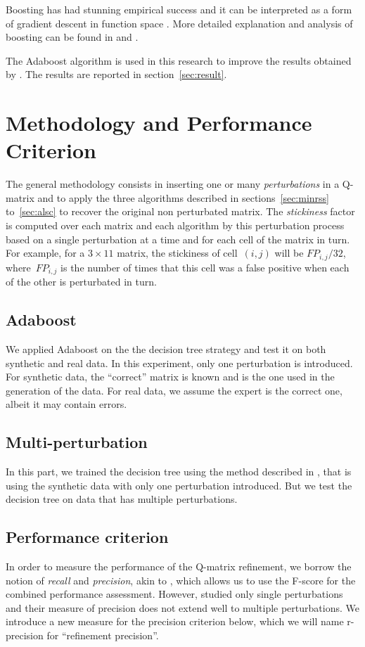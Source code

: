 \documentclass{edm_template}
\begin{document}
Boosting has had stunning empirical success \cite{caruana2006empirical} and it can be interpreted as a form of gradient descent in function space \cite{breiman1998arcing}. More detailed explanation and analysis of boosting can be found in and . 

The Adaboost algorithm is used in this research to improve the results obtained by . The results are reported in section~\ref{sec:result}.

\section{Methodology and Performance Criterion}

The general methodology consists in inserting one or many \textit{perturbations} in a Q-matrix and to apply the three algorithms described in sections~\ref{sec:minrss} to~\ref{sec:alsc} to recover the original non perturbated matrix.  The \textit{stickiness} factor is computed over each matrix and each algorithm by this perturbation process based on a single perturbation at a time and for each cell of the matrix in turn.  For example, for a $3\times 11$ matrix, the stickiness of cell~$(i,j)$ will be $FP_{i,j}/32$, where~$FP_{i,j}$ is the number of times that this cell was a false positive when each of the other is perturbated in turn.

\subsection{Adaboost}
We applied Adaboost on the the decision tree strategy and test it on both synthetic and real data. In this experiment, only one perturbation is introduced.  For synthetic data, the ``correct'' matrix is known and is the one used in the generation of the data.  For real data, we assume the expert is the correct one, albeit it may contain errors.
\subsection{Multi-perturbation}
In this part, we trained the decision tree using the method described in , that is using the synthetic data with only one perturbation introduced. But we test the decision tree on data that has multiple perturbations.
\subsection{Performance criterion}
In order to measure the performance of the Q-matrix refinement, we borrow the notion of \textit{recall} and \textit{precision}, akin to , which allows us to use the F-score for the combined performance assessment. However,  studied only single perturbations and their measure of precision does not extend well to multiple perturbations. We introduce a new measure for the precision criterion below, which we will name r-precision for ``refinement precision''.
\end{document}

